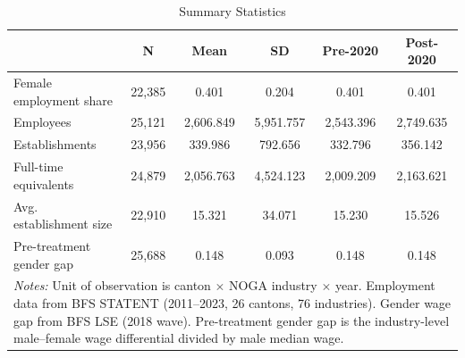 \begin{table}[!htbp]
\centering
\caption{Summary Statistics}
\label{tab:sumstats}
\begin{tabular}{lccccc}
\hline\hline
 & N & Mean & SD & Pre-2020 & Post-2020 \\
\hline
Female employment share & 22,385 & 0.401 & 0.204 & 0.401 & 0.401 \\
Employees & 25,121 & 2,606.849 & 5,951.757 & 2,543.396 & 2,749.635 \\
Establishments & 23,956 & 339.986 & 792.656 & 332.796 & 356.142 \\
Full-time equivalents & 24,879 & 2,056.763 & 4,524.123 & 2,009.209 & 2,163.621 \\
Avg. establishment size & 22,910 & 15.321 & 34.071 & 15.230 & 15.526 \\
Pre-treatment gender gap & 25,688 & 0.148 & 0.093 & 0.148 & 0.148 \\
\hline
\multicolumn{6}{p{0.9\textwidth}}{\footnotesize \textit{Notes:} Unit of observation is canton $\times$ NOGA industry $\times$ year. Employment data from BFS STATENT (2011--2023, 26 cantons, 76 industries). Gender wage gap from BFS LSE (2018 wave). Pre-treatment gender gap is the industry-level male--female wage differential divided by male median wage.} \\
\hline\hline
\end{tabular}
\end{table}
